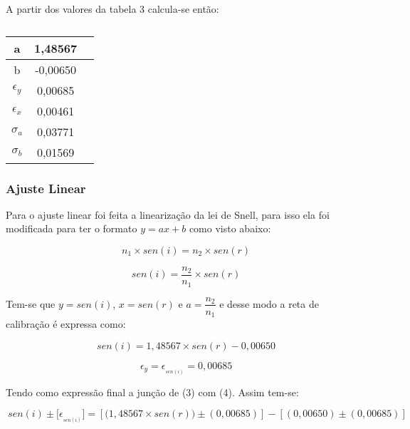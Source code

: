 \documentclass [a4paper, 12pt]{article}
\begin{document}
A partir dos valores da tabela 3 calcula-se então:


\begin{table}[h!]
\centering
\caption{\empty}
\vspace{0.1 cm}
\begin{tabular}{|c|c|c|} \hline

a               &    1,48567     \\ \hline
b               &    -0,00650    \\ \hline
$\epsilon_y$    &    0,00685     \\ \hline
$\epsilon_x$    &    0,00461     \\ \hline
$\sigma_a$      &    0,03771     \\ \hline
$\sigma_b$      &    0,01569     \\ \hline

\end{tabular}
\end{table}

\subsubsection{Ajuste Linear}

Para o ajuste linear foi feita a linearização da lei de Snell, para isso ela foi modificada para ter o formato $y = ax + b$ como visto abaixo:

\begin{equation}
  \ n_{1} \times sen (i) = n_{2} \times sen (r)
\end{equation}

\begin{equation}
  \ sen (i) = \dfrac{n_{2}}{n_{1}} \times sen (r)
\end{equation}

Tem-se que $y = sen (i)$, $x = sen (r)$ e $a = \dfrac{n_2}{n_1}$ e desse modo a reta de calibração é expressa como:

\begin{equation}
  \ sen (i)  = 1,48567\times sen (r)  - 0,00650
\end{equation}

\begin{equation}
  \ \epsilon_y = \epsilon_{_{sen(i)}} = 0,00685
\end{equation}

Tendo como expressão final a junção de (3) com (4). Assim tem-se:

\begin{equation}
  \ sen (i) \pm \big[ \epsilon_{_{sen(i)}} \big] = [\Big(1,48567\times sen (r)\Big) \pm (0,00685)] - [(0,00650) \pm (0,00685)]
\end{equation}
\end{document}
